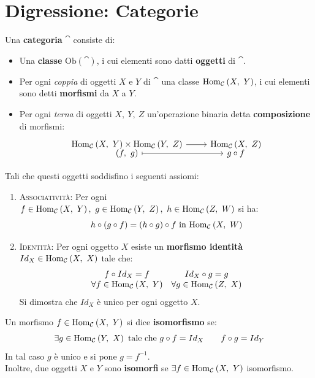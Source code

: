 \section{Digressione: Categorie}
\begin{define}
	Una \textbf{categoria} $\cat$ consiste di:
	\begin{itemize}
		\item Una \textbf{classe} $\mathrm{Ob}\left(\cat\right)$, i cui elementi sono datti \textbf{oggetti} di $\cat$.
		\item Per ogni \textit{coppia} di oggetti $X$ e $Y$ di $\cat$ una classe $\mathrm{Hom}_{\mathcal{C}}\left(X,\ Y\right)$, i cui elementi sono detti \textbf{morfismi} da $X$ a $Y$.
		\item Per ogni \textit{terna} di oggetti $X,\ Y,\ Z$ un'operazione binaria detta \textbf{composizione} di morfismi:
		\begin{equation}
			\funztot{\ }{\homo{\cat}{X}{Y}\times \homo{\cat}{Y}{Z}}{\homo{\cat}{X}{Z}}{\left(f,\ g\right)}{g\circ f}
		\end{equation}
	\end{itemize}
Tali che questi oggetti soddisfino i seguenti assiomi:
\begin{enumerate}
	\item \textsc{Associatività}: Per ogni $f\in\homo{\cat}{X}{Y},\ g\in\homo{\cat}{Y}{Z},\ h\in\homo{\cat}{Z}{W}$ si ha:
	\begin{equation}
		h\circ\left(g\circ f\right)=\left(h\circ g\right)\circ f\text{ in }\mathrm{Hom}_{\mathcal{C}}\left(X,\ W\right)
	\end{equation}
	\item \textsc{Identità}: Per ogni oggetto $X$ esiste un \textbf{morfismo identità} $Id_{X}\in\mathrm{Hom}_{\mathcal{C}}\left(X,\ X\right)$ tale che:
	\begin{equation}
		\begin{array}{cc}
			f\circ Id_X=f&Id_X\circ g=g\\
			\forall f\in\mathrm{Hom}_{\mathcal{C}}\left(X,\ Y\right)&\forall g\in\mathrm{Hom}_{\mathcal{C}}\left(Z,\ X\right)
		\end{array}
	\end{equation}
Si dimostra che $Id_X$ è unico per ogni oggetto $X$.
\end{enumerate} 
\end{define}
\begin{define}
	Un morfismo $f\in\mathrm{Hom}_{\mathcal{C}}\left(X,\ Y\right)$ si dice \textbf{isomorfismo} se:
	\begin{equation}
		 \exists g\in \mathrm{Hom}_{\mathcal{C}}\left(Y,\ X\right) \text{ tale che } g\circ f=Id_X\qquad f\circ g=Id_Y
	\end{equation}
In tal caso $g$ è unico e si pone $g=f^{-1}$.\\
Inoltre, due oggetti $X$ e $Y$ sono \textbf{isomorfi} se $\exists f\in \mathrm{Hom}_{\mathcal{C}}\left(X,\ Y\right)$ isomorfismo.
\end{define}
